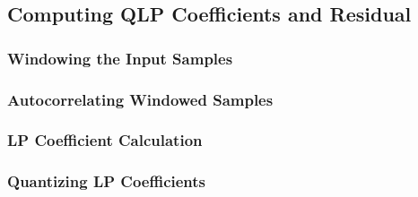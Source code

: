 
\subsection{Computing QLP Coefficients and Residual}
\label{alac:compute_qlp_coeffs}
{
  
}


\clearpage

\subsubsection{Windowing the Input Samples}
\label{alac:window}
{
  
}

\subsubsection{Autocorrelating Windowed Samples}
\label{alac:autocorrelate}
{
  
}

\subsubsection{LP Coefficient Calculation}
\label{alac:compute_lp_coeffs}
{
  
}

\subsubsection{Quantizing LP Coefficients}
\label{alac:quantize_lp_coeffs}


